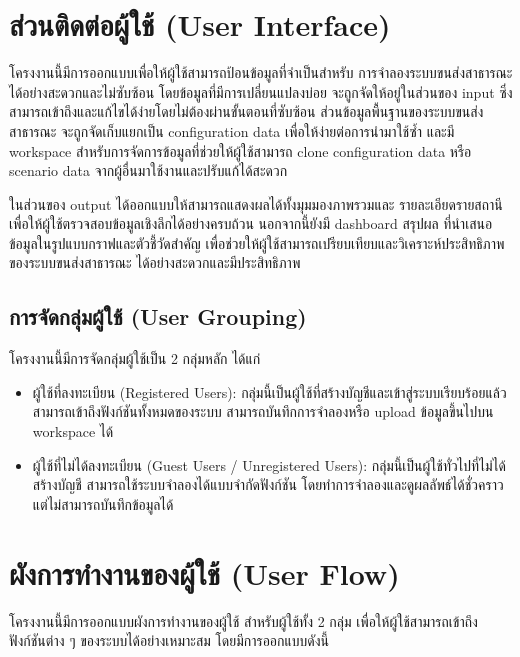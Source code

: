 \section{ส่วนติดต่อผู้ใช้ (User Interface)}
\begin{mypara}
    \indent โครงงานนี้มีการออกแบบเพื่อให้ผู้ใช้สามารถป้อนข้อมูลที่จำเป็นสำหรับ
    การจำลองระบบขนส่งสาธารณะได้อย่างสะดวกและไม่ซับซ้อน 
    โดยข้อมูลที่มีการเปลี่ยนแปลงบ่อย จะถูกจัดให้อยู่ในส่วนของ input 
    ซึ่งสามารถเข้าถึงและแก้ไขได้ง่ายโดยไม่ต้องผ่านขั้นตอนที่ซับซ้อน 
    ส่วนข้อมูลพื้นฐานของระบบขนส่งสาธารณะ จะถูกจัดเก็บแยกเป็น configuration data 
    เพื่อให้ง่ายต่อการนำมาใช้ซ้ำ และมี workspace สำหรับการจัดการข้อมูลที่ช่วยให้ผู้ใช้สามารถ 
    clone configuration data หรือ scenario data จากผู้อื่นมาใช้งานและปรับแก้ได้สะดวก

  \indent ในส่วนของ output ได้ออกแบบให้สามารถแสดงผลได้ทั้งมุมมองภาพรวมและ
  รายละเอียดรายสถานี เพื่อให้ผู้ใช้ตรวจสอบข้อมูลเชิงลึกได้อย่างครบถ้วน นอกจากนี้ยังมี 
  dashboard สรุปผล ที่นำเสนอข้อมูลในรูปแบบกราฟและตัวชี้วัดสำคัญ 
  เพื่อช่วยให้ผู้ใช้สามารถเปรียบเทียบและวิเคราะห์ประสิทธิภาพของระบบขนส่งสาธารณะ
  ได้อย่างสะดวกและมีประสิทธิภาพ
\end{mypara}

\subsection{การจัดกลุ่มผู้ใช้ (User Grouping)}
\begin{mypara}
\indent โครงงานนี้มีการจัดกลุ่มผู้ใช้เป็น 2 กลุ่มหลัก ได้แก่
\begin{itemize}
    \item ผู้ใช้ที่ลงทะเบียน (Registered Users): กลุ่มนี้เป็นผู้ใช้ที่สร้างบัญชีและเข้าสู่ระบบเรียบร้อยแล้ว 
    สามารถเข้าถึงฟังก์ชันทั้งหมดของระบบ สามารถบันทึกการจำลองหรือ upload ข้อมูลขึ้นไปบน workspace ได้ 
    \item ผู้ใช้ที่ไม่ได้ลงทะเบียน (Guest Users / Unregistered Users): กลุ่มนี้เป็นผู้ใช้ทั่วไปที่ไม่ได้สร้างบัญชี 
    สามารถใช้ระบบจำลองได้แบบจำกัดฟังก์ชัน โดยทำการจำลองและดูผลลัพธ์ได้ชั่วคราว 
    แต่ไม่สามารถบันทึกข้อมูลได้
\end{itemize}
\end{mypara}
\section{ผังการทำงานของผู้ใช้ (User Flow)}
\begin{mypara}
    \indent โครงงานนี้มีการออกแบบผังการทำงานของผู้ใช้ สำหรับผู้ใช้ทั้ง 2 กลุ่ม เพื่อให้ผู้ใช้สามารถเข้าถึงฟังก์ชันต่าง ๆ ของระบบได้อย่างเหมาะสม 
    โดยมีการออกแบบดังนี้
\end{mypara}
